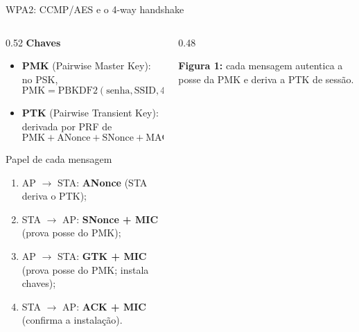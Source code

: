 \documentclass[aspectratio=169,11pt]{beamer}
\begin{document}
\begin{frame}{WPA2: CCMP/AES e o 4-way handshake}
  \begin{columns}
    \begin{column}{0.52\textwidth}
      \textbf{Chaves}
      \begin{itemize}\small
        \item \textbf{PMK} (Pairwise Master Key): no PSK,
          $$\text{PMK} = \text{PBKDF2}(\text{senha}, \text{SSID}, 4096, 256);$$
        \item \textbf{PTK} (Pairwise Transient Key): derivada por PRF de
          $$\text{PMK} + \text{ANonce} + \text{SNonce} + \text{MAC}_{\text{AP}} + \text{MAC}_{\text{STA}}.$$
      \end{itemize}
      \begin{block}{Papel de cada mensagem}
        \begin{enumerate}\footnotesize
          \item AP $\to$ STA: \textbf{ANonce} (STA deriva o PTK);
          \item STA $\to$ AP: \textbf{SNonce + MIC} (prova posse do PMK);
          \item AP $\to$ STA: \textbf{GTK + MIC} (prova posse do PMK; instala chaves);
          \item STA $\to$ AP: \textbf{ACK + MIC} (confirma a instalação).
        \end{enumerate}
      \end{block}
    \end{column}
    \begin{column}{0.48\textwidth}
      \begin{center}
      \end{center}
      \vspace{1mm}
      {\scriptsize \textbf{Figura 1:} cada mensagem autentica a posse da PMK e deriva a PTK de sessão.}
    \end{column}
  \end{columns}
\end{frame}
\end{document}
